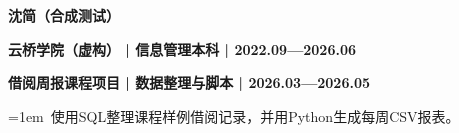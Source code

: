 \documentclass[11pt,a4paper,fontset=fandol]{ctexart}
\begin{document}
{\LARGE\bfseries 沈简（合成测试）}\par
\par\medskip{}\par\nobreak
\begin{minipage}{\linewidth}
\textbf{云桥学院（虚构） | 信息管理本科 | 2022.09—2026.06}\par
\end{minipage}\par
\par\medskip{}\par\nobreak
\begin{minipage}{\linewidth}
\textbf{借阅周报课程项目 | 数据整理与脚本 | 2026.03—2026.05}\par
\noindent\hangindent=1em\textbullet\ 使用SQL整理课程样例借阅记录，并用Python生成每周CSV报表。\par
\end{minipage}\par
\end{document}
